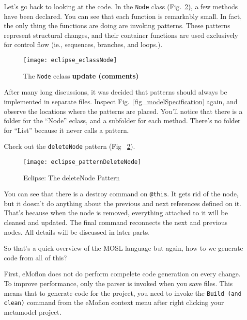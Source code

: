 Let's go back to looking at the code. In the \texttt{Node} class (Fig.~\ref{fig_patternDeleteNode}), a few methods have been declared. You can see that each
function is remarkably small. In fact, the only thing the functions are doing are invoking patterns. These patterns represent structural changes, and their
container functions are used exclusively for control flow (ie., sequences, branches, and loops.).

 \begin{figure}[htbp]
  \centering
  \texttt{[image: eclipse\_eclassNode]}
  \caption{The \texttt{Node} eclass {\bf update (comments)}}
  \label{fig_eclassNode}
\end{figure}


After many long discussions, it was decided that patterns should always be implemented in separate files. Inspect Fig.~\ref{fig_modelSpecification} again, and
observe the locations where the patterns are placed. You'll notice that there is a folder for the ``Node'' eclass, and a subfolder for each method. There's no
folder for ``List'' because it never calls a pattern.

Check out the \texttt{deleteNode} pattern (Fig ~\ref{fig_patternDeleteNode}).

 \begin{figure}[htbp]
  \centering
  \texttt{[image: eclipse\_patternDeleteNode]}
  \caption{Eclipse: The deleteNode Pattern}
  \label{fig_patternDeleteNode}
\end{figure}

You can see that there is a destroy command on \texttt{@this}. It gets rid of the node, but it doesn't do anything about the previous and next references
defined on it. That's because when the node is removed, everything attached to it will be cleaned and updated. The final command reconnects the next and
previous nodes. All details will be discussed in later parts.
 
So that's a quick overview of the MOSL language but again, how to we generate code from all of this?


First, eMoflon does not do perform compelete code generation on every change. To improve performance, only the parser is invoked when you save files. This means
that to generate code for the project, you need to invoke the \texttt{Build (and clean)} command from the eMoflon context menu after right clicking your
metamodel project.
